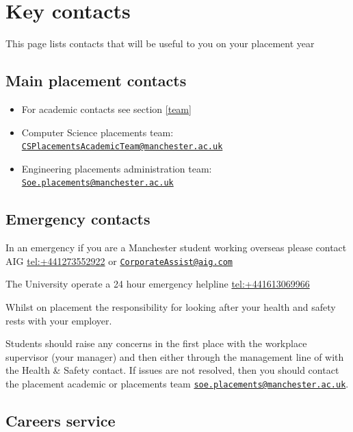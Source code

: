 \documentclass[
]{book}
\providecommand{\tightlist}{%
  \setlength{\itemsep}{0pt}\setlength{\parskip}{0pt}}
\begin{document}
\chapter{Key contacts}\label{contacts}

This page lists contacts that will be useful to you on your placement year

\section{Main placement contacts}\label{main}

\begin{itemize}
\tightlist
\item
  For academic contacts see section \ref{team}
\item
  Computer Science placements team: \href{mailto:CSPlacementsAcademicTeam@manchester.ac.uk}{\nolinkurl{CSPlacementsAcademicTeam@manchester.ac.uk}}
\item
  Engineering placements administration team: \href{mailto:Soe.placements@manchester.ac.uk}{\nolinkurl{Soe.placements@manchester.ac.uk}}
\end{itemize}

\section{Emergency contacts}\label{emergency}

In an emergency if you are a Manchester student working overseas please contact AIG \url{tel:+441273552922} or \href{mailto:CorporateAssist@aig.com}{\nolinkurl{CorporateAssist@aig.com}}

The University operate a 24 hour emergency helpline \url{tel:+441613069966}

Whilst on placement the responsibility for looking after your health and safety rests with your employer.

Students should raise any concerns in the first place with the workplace supervisor (your manager) and then either through the management line of with the Health \& Safety contact. If issues are not resolved, then you should contact the placement academic or placements team \href{mailto:soe.placements@manchester.ac.uk}{\nolinkurl{soe.placements@manchester.ac.uk}}.

\section{Careers service}\label{careers}
\end{document}

